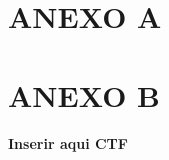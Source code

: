 \clearpage
\vspace*{\fill}
\section*{\centering ANEXO A}
\vspace*{\fill}
\clearpage
\newpage


\clearpage


\clearpage
\vspace*{\fill}
\section*{\centering ANEXO B}
\vspace*{\fill}
\clearpage
\newpage



\vspace*{\fill}
\begin{center}
\textbf{Inserir aqui CTF}
\end{center}
\vspace*{\fill}
